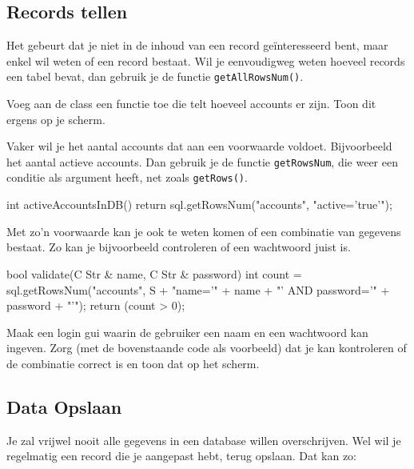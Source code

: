 \subsection{Records tellen}
Het gebeurt dat je niet in de inhoud van een record ge\"interesseerd bent, maar enkel wil weten of een record bestaat. Wil je eenvoudigweg weten hoeveel records een tabel bevat, dan gebruik je de functie \texttt{getAllRowsNum()}.

\begin{code} {
int accountsInDB() {
  return sql.getAllRowsNum("accounts");
}
\end{code}

\begin{exercise}
Voeg aan de class  een functie toe die telt hoeveel accounts er zijn. Toon dit ergens op je scherm.
\end{exercise}

Vaker wil je het aantal accounts dat aan een voorwaarde voldoet. Bijvoorbeeld het aantal actieve accounts. Dan gebruik je de functie \texttt{getRowsNum}, die weer een conditie als argument heeft, net zoals \texttt{getRows()}.

\begin{code}
int activeAccountsInDB() {
  return sql.getRowsNum("accounts", "active='true'");
}
\end{code}

Met zo'n voorwaarde kan je ook te weten komen of een combinatie van gegevens bestaat. Zo kan je bijvoorbeeld controleren of een wachtwoord juist is.

\begin{code}
bool validate(C Str & name, C Str & password) {
  int count = sql.getRowsNum("accounts", S + "name='" + name + "' AND password='" + password + "'");
	return (count > 0);
}
\end{code}

\begin{exercise}
Maak een login gui waarin de gebruiker een naam en een wachtwoord kan ingeven. Zorg (met de bovenstaande code als voorbeeld) dat je kan kontroleren of de combinatie correct is en toon dat op het scherm.
\end{exercise}

\subsection{Data Opslaan}
Je zal vrijwel nooit alle gegevens in een database willen overschrijven. Wel wil je regelmatig een record die je aangepast hebt, terug opslaan. Dat kan zo:

